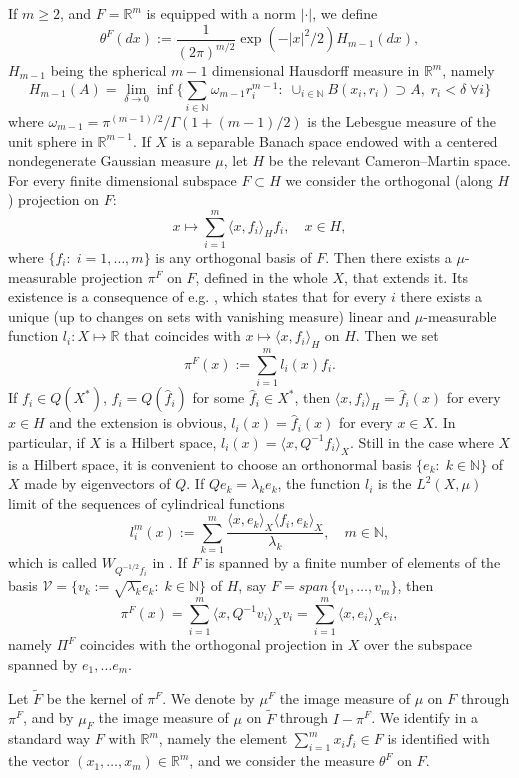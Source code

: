 \documentclass[reqno,twoside,12pt]{amsart}
\begin{document}
If $m\geq 2$, and $F={\mathbb R}^m$ is equipped with a norm $|\cdot |$,   we define 
$$\theta^F(dx) := \frac{1}{(2\pi)^{m/2}} \exp(-|x|^2/2)H_{m-1}(dx), $$
$H_{m-1}$ being the spherical $m-1$ dimensional Hausdorff measure in ${\mathbb R}^m$, namely 
$$H_{m-1}(A) = \lim_{\delta\to 0} \inf\bigg\{ \sum_{i\in {\mathbb N}}\omega_{m-1}r_i^{m-1}:\;\cup_{i\in {\mathbb N}}B(x_i, r_i)\supset A, \;r_i <\delta \;\forall i \bigg\}$$
where $ \omega_{m-1} = \pi^{(m-1)/2}/\Gamma(1+(m-1)/2)$ is the Lebesgue measure of the unit sphere in ${\mathbb R}^{m-1}$. 
If $X$ is a separable Banach space endowed with a centered nondegenerate Gaussian measure $\mu$, let $H$ be the relevant Cameron--Martin space. For every finite dimensional subspace $F\subset H$ 
we consider  the orthogonal (along $H$) projection on $F$:
$$x\mapsto  \sum_{i=1}^{m}\langle x, f_i\rangle_H f_i ,\quad x\in H, $$
where $\{f_i:\;i=1, \ldots, m\}$ is any orthogonal basis of $F$. Then there
exists a $\mu$-measurable projection $\pi^F$ on $F$, defined in the whole  $X$, that extends it. Its existence is a consequence of   e.g. \cite[Thm. 2.10.11]{Boga}, which states that for every  $i$ there exists a unique  (up to changes on sets with vanishing measure) linear and $\mu$-measurable function $l_i :X\mapsto {\mathbb R}$ that coincides with  $x\mapsto \langle x, f_i\rangle_H$ on $H$. Then we set 
$$\pi^F(x) := \sum_{i=1}^{m}l_i(x)f_i.$$
If $f_i\in Q(X^*)$, $f_i = Q(\hat{f}_i)$ for some $\hat{f}_i\in X^*$, then  $\langle x, f_i\rangle_H = \hat{f}_i(x)$  for every $x\in H$ and the extension is obvious, $l_i(x)  = \hat{f}_i(x)$ for every $x\in X$. In particular, if $X$ is a Hilbert space, 
$l_i(x)  = \langle x, Q^{-1}f_i\rangle_X$. Still
in the case where $X$ is a Hilbert space, it is convenient to choose an orthonormal basis $\{e_k:\;k\in {\mathbb N}\}$ of $X$ made by eigenvectors of $Q$. If $Qe_k = \lambda_k e_k$, the function 
$l_i$ is the $L^2(X, \mu)$ limit of the sequences of cylindrical functions
$$l_i^m(x) :=  \sum_{k=1}^{m}\frac{\langle x, e_k\rangle_X  \langle f_i, e_k\rangle_X}{\lambda_k}, \quad m\in {\mathbb N}, $$
which  is called  $W_{Q^{-1/2}f_i}$ in \cite{DP}. 
If $F$ is spanned by a finite number of elements of the basis $\mathcal V = \{v_k:= \sqrt{\lambda_k}e_k:\;k\in {\mathbb N}\}$ of $H$, say $F= span\,\{ v_1, \ldots, v_m\}$, then 
$$\pi^F(x)  = \sum_{i=1}^{m}\langle x, Q^{-1}v_i\rangle_X v_i = \sum_{i=1}^{m}\langle x, e_i\rangle_Xe_i ,$$
namely $\Pi^F$ coincides with the orthogonal projection in $X$ over the subspace spanned by $e_1, \ldots e_m$. 

Let   $\widetilde{F}$ be  the kernel  of $\pi^F$. We denote by
$\mu^F$  the image measure of $\mu$ on $F$   through $\pi^F$, and by  $\mu_F$ the image measure of $\mu$ on   $\widetilde{F}$  through   $I-\pi^F$. We identify in a standard way $F$ with ${\mathbb R}^m$, namely the element $\sum_{i=1}^{m}x_i f_i\in F$ is identified with the vector $(x_1, \ldots, x_m)\in {\mathbb R}^m$, 
 and we consider the measure $\theta^F$ on $F$. 
\end{document}
